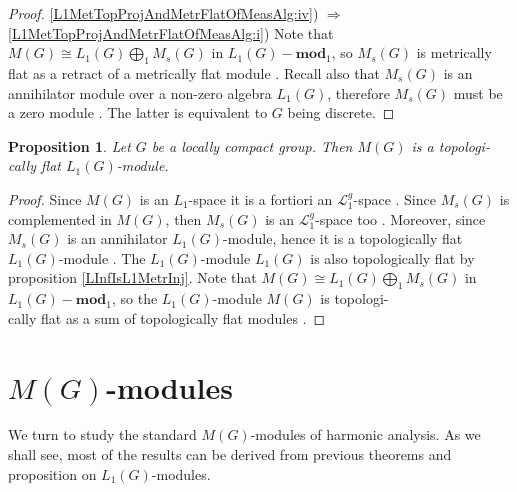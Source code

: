 \documentclass{article}
\theoremstyle{plain}
\newtheorem{proposition}{Proposition}[section]
\theoremstyle{definition}
\newtheorem{proof}{Proof}\def\theproof{}
\newcommand{\isom}{\mathop{\mathbin{\cong}}}
\begin{document}
\begin{fulltext}
\begin{proof}
\ref{L1MetTopProjAndMetrFlatOfMeasAlg:iv}) $\Longrightarrow$ \ref{L1MetTopProjAndMetrFlatOfMeasAlg:i})
Note that $M(G)\isom L_1(G)\bigoplus_1 M_s(G)$ in 
$L_1(G)-\mathbf{mod}_1$, so $M_s(G)$ is metrically flat as a retract of a metrically 
flat module \cite[proposition 2.27]{NemGeomProjInjFlatBanMod}. Recall also that 
$M_s(G)$ is an annihilator module over a non-zero algebra $L_1(G)$, therefore $M_s(G)$ 
must be a zero module \cite[proposition 3.6]{NemGeomProjInjFlatBanMod}. The latter 
is equivalent to $G$ being discrete.
\end{proof}

\begin{proposition}\label{MeasAlgIsL1TopFlat} Let $G$ be a locally compact group. 
Then $M(G)$ is a topologi-\\cally flat $L_1(G)$-module.
\end{proposition}
\begin{proof} Since $M(G)$ is an $L_1$-space it is a fortiori an $\mathcal{L}_1^g$-space 
\cite[paragraph 3.13, exercise 4.7(b)]{DefFloTensNorOpId}. Since $M_s(G)$ is complemented 
in $M(G)$, then $M_s(G)$ is an $\mathcal{L}_1^g$-space too 
\cite[corollary 23.2.1(2)]{DefFloTensNorOpId}. Moreover, since $M_s(G)$ is an annihilator 
$L_1(G)$-module, hence it is a topologically flat $L_1(G)$-module 
\cite[proposition 3.6]{NemGeomProjInjFlatBanMod}. The $L_1(G)$-module $L_1(G)$ is also 
topologically flat by proposition \ref{LInfIsL1MetrInj}. 
Note that $M(G)\isom L_1(G)\bigoplus_1 M_s(G)$ in $L_1(G)-\mathbf{mod}_1$, so the $L_1(G)$-module 
$M(G)$ is topologi-\\cally flat as a sum of topologically flat modules 
\cite[proposition 2.27]{NemGeomProjInjFlatBanMod}.
\end{proof}


\section{\texorpdfstring{$M(G)$}{M(G)}-modules}
\label{SubSectionMGModules}

We turn to study the standard $M(G)$-modules of harmonic analysis. As we shall see, most of 
the results can be derived from previous theorems and proposition on $L_1(G)$-modules.


\end{fulltext}
\end{document}
